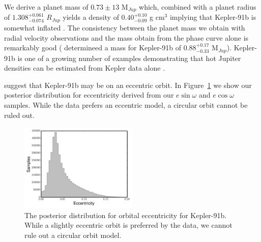\documentclass[apjl]{emulateapj}
\begin{document}
We derive a planet mass of $0.73\pm 13$ M$_{Jup}$ which, combined with a planet radius of $1.308^{+0.061}_{-0.074}$ $R_{Jup}$ yields a density of $0.40^{+0.10}_{-0.09}$ g cm$^{3}$ implying that Kepler-91b is somewhat inflated \citep{baraffe10}. The consistency between the planet mass we obtain with radial velocity observations and the mass \citet{lillo14} obtain from the phase curve alone is remarkably good (\citeauthor{lillo14} determineed a mass for Kepler-91b of $0.88^{+0.17}_{-0.33}$ M$_{Jup}$). Kepler-91b is one of a growing number of examples demonstrating that hot Jupiter densities can be estimated from Kepler data alone \citep[e.g.][]{barclay12,quintana13,esteves13}.

\citet{lillo14} suggest that Kepler-91b may be on an eccentric orbit. In Figure~\ref{fig:ecc} we show our posterior distribution for eccentricity derived from our $e\sin{\omega}$ and $e\cos{\omega}$ samples. While the data prefers an eccentric model, a circular orbit cannot be ruled out.

\begin{figure}
\includegraphics[width=0.50\textwidth]{ecc_hist.png}
\caption{The posterior distribution for orbital eccentricity for Kepler-91b. While a slightly eccentric orbit is preferred by the data, we cannot rule out a circular orbit model.}
\label{fig:ecc}
\end{figure}
\end{document}
